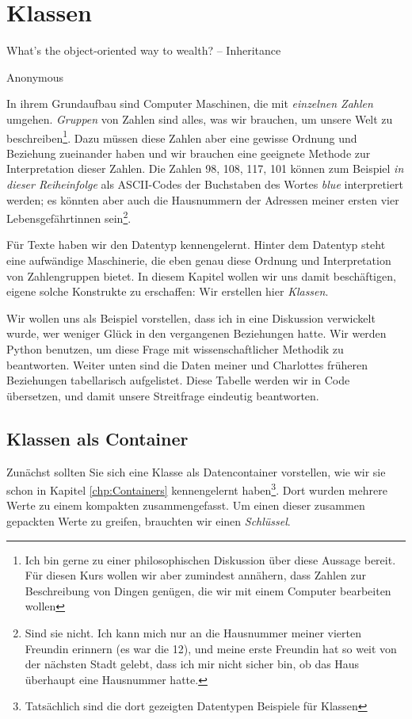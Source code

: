 \chapter{Klassen}
\label{chp:Classes}
\epigraph{
	What's the object-oriented way to wealth? -- Inheritance
}{Anonymous}

In ihrem Grundaufbau sind Computer Maschinen, die mit \emph{einzelnen Zahlen} umgehen. \emph{Gruppen} von Zahlen sind alles, was wir brauchen, um unsere Welt zu beschreiben\footnote{Ich bin gerne zu einer philosophischen Diskussion über diese Aussage bereit. Für diesen Kurs wollen wir aber zumindest annähern, dass Zahlen zur Beschreibung von Dingen genügen, die wir mit einem Computer bearbeiten wollen}. Dazu müssen diese Zahlen aber eine gewisse Ordnung und Beziehung zueinander haben und wir brauchen eine geeignete Methode zur Interpretation dieser Zahlen. Die Zahlen 98, 108, 117, 101 können zum Beispiel \emph{in dieser Reiheinfolge} als ASCII-Codes der Buchstaben des Wortes \emph{blue} interpretiert werden; es könnten aber auch die Hausnummern der Adressen meiner ersten vier Lebensgefährtinnen sein\footnote{Sind sie nicht. Ich kann mich nur an die Hausnummer meiner vierten Freundin erinnern (es war die 12), und meine erste Freundin hat so weit von der nächsten Stadt gelebt, dass ich mir nicht sicher bin, ob das Haus überhaupt eine Hausnummer hatte.}.

Für Texte haben wir den Datentyp  kennengelernt. Hinter dem Datentyp steht eine aufwändige Maschinerie, die eben genau diese Ordnung und Interpretation von Zahlengruppen bietet. In diesem Kapitel wollen wir uns damit beschäftigen, eigene solche Konstrukte zu erschaffen: Wir erstellen hier \emph{Klassen}.

Wir wollen uns als Beispiel vorstellen, dass ich in eine Diskussion verwickelt wurde, wer weniger Glück in den vergangenen Beziehungen hatte. Wir werden Python benutzen, um diese Frage mit wissenschaftlicher Methodik zu beantworten. Weiter unten sind die Daten meiner und Charlottes früheren Beziehungen tabellarisch aufgelistet. Diese Tabelle werden wir in Code übersetzen, und damit unsere Streitfrage eindeutig beantworten.

\section{Klassen als Container}
Zunächst sollten Sie sich eine Klasse als Datencontainer vorstellen, wie wir sie schon in Kapitel \ref{chp:Containers} kennengelernt haben\footnote{Tatsächlich sind die dort gezeigten Datentypen Beispiele für Klassen}. Dort wurden mehrere \eg Werte zu einem kompakten  zusammengefasst. Um einen dieser zusammen gepackten Werte zu greifen, brauchten wir einen \emph{Schlüssel}.

